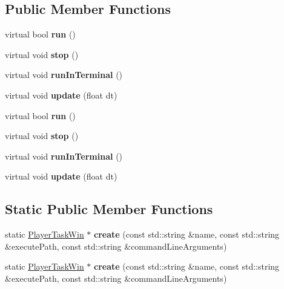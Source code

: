 \subsection*{Public Member Functions}
\begin{DoxyCompactItemize}
\item 
\mbox{\label{classPlayerTaskWin_a1d614f15aadb6d4e13616dfeb7222493}} 
virtual bool {\bfseries run} ()
\item 
\mbox{\label{classPlayerTaskWin_ac0bae7cee7897d078f0ff86d0d7d2c82}} 
virtual void {\bfseries stop} ()
\item 
\mbox{\label{classPlayerTaskWin_aa71fabbeecb9a4d5d117290e443b80f8}} 
virtual void {\bfseries run\+In\+Terminal} ()
\item 
\mbox{\label{classPlayerTaskWin_ab77da0fa7e479ce9e8d1b5bc91bebeba}} 
virtual void {\bfseries update} (float dt)
\item 
\mbox{\label{classPlayerTaskWin_ab82cb534f3e6c597f87bbace2c1cefe9}} 
virtual bool {\bfseries run} ()
\item 
\mbox{\label{classPlayerTaskWin_af6593aa3de9c846a8359b284daa573c4}} 
virtual void {\bfseries stop} ()
\item 
\mbox{\label{classPlayerTaskWin_a934037351f304223b0f7ad3f051f54bb}} 
virtual void {\bfseries run\+In\+Terminal} ()
\item 
\mbox{\label{classPlayerTaskWin_aad7efa643b9c98f9492b4dc9ca7e2de9}} 
virtual void {\bfseries update} (float dt)
\end{DoxyCompactItemize}
\subsection*{Static Public Member Functions}
\begin{DoxyCompactItemize}
\item 
\mbox{\label{classPlayerTaskWin_ae7bd50b206013c4fd5683c8010aaa73f}} 
static \hyperlink{classPlayerTaskWin}{Player\+Task\+Win} $\ast$ {\bfseries create} (const std\+::string \&name, const std\+::string \&execute\+Path, const std\+::string \&command\+Line\+Arguments)
\item 
\mbox{\label{classPlayerTaskWin_aa19ca8c171f447be6414f1c4b3129bfb}} 
static \hyperlink{classPlayerTaskWin}{Player\+Task\+Win} $\ast$ {\bfseries create} (const std\+::string \&name, const std\+::string \&execute\+Path, const std\+::string \&command\+Line\+Arguments)
\end{DoxyCompactItemize}
